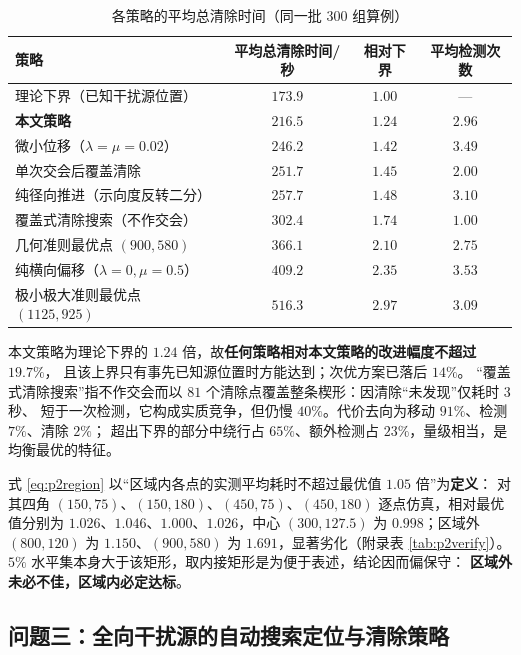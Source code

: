 \documentclass[withoutpreface, bwprint]{cumcmthesis}
\begin{document}
\begin{table}[H]
  \centering
  \caption{各策略的平均总清除时间（同一批 $300$ 组算例）}
  \label{tab:p2compare2}
  \footnotesize
  \begin{tabular}{lccc}
    \toprule
    策略 & 平均总清除时间/秒 & 相对下界 & 平均检测次数 \\
    \midrule
    理论下界（已知干扰源位置）              & $173.9$ & $1.00$ & --- \\
    \textbf{本文策略}                       & $\mathbf{216.5}$ & $\mathbf{1.24}$ & $2.96$ \\
    微小位移（$\lambda=\mu=0.02$）          & $246.2$ & $1.42$ & $3.49$ \\
    单次交会后覆盖清除                      & $251.7$ & $1.45$ & $2.00$ \\
    纯径向推进（示向度反转二分）            & $257.7$ & $1.48$ & $3.10$ \\
    覆盖式清除搜索（不作交会）              & $302.4$ & $1.74$ & $1.00$ \\
    几何准则最优点 $(900,580)$              & $366.1$ & $2.10$ & $2.75$ \\
    纯横向偏移（$\lambda=0,\mu=0.5$）       & $409.2$ & $2.35$ & $3.53$ \\
    极小极大准则最优点 $(1125,925)$         & $516.3$ & $2.97$ & $3.09$ \\
    \bottomrule
  \end{tabular}
\end{table}

本文策略为理论下界的 $1.24$ 倍，故\textbf{任何策略相对本文策略的改进幅度不超过 $19.7\%$}，
且该上界只有事先已知源位置时方能达到；次优方案已落后 $14\%$。
“覆盖式清除搜索”指不作交会而以 $81$ 个清除点覆盖整条楔形：因清除“未发现”仅耗时 $3$ 秒、
短于一次检测，它构成实质竞争，但仍慢 $40\%$。代价去向为移动 $91\%$、检测 $7\%$、清除 $2\%$；
超出下界的部分中绕行占 $65\%$、额外检测占 $23\%$，量级相当，是均衡最优的特征。

式 \eqref{eq:p2region} 以“区域内各点的实测平均耗时不超过最优值 $1.05$ 倍”为\textbf{定义}：
对其四角 $(150,75)$、$(150,180)$、$(450,75)$、$(450,180)$ 逐点仿真，相对最优值分别为
$1.026$、$1.046$、$1.000$、$1.026$，中心 $(300,127.5)$ 为 $0.998$；区域外 $(800,120)$
为 $1.150$、$(900,580)$ 为 $1.691$，显著劣化（附录表 \ref{tab:p2verify}）。
$5\%$ 水平集本身大于该矩形，取内接矩形是为便于表述，结论因而偏保守：
\textbf{区域外未必不佳，区域内必定达标}。

\subsection{问题三：全向干扰源的自动搜索定位与清除策略}
\end{document}
